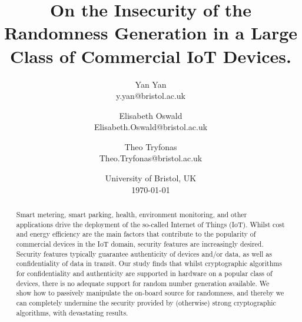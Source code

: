 \documentclass{article}
\title{On the Insecurity of the Randomness Generation in a Large Class of Commercial IoT Devices.}
\author{ 
Yan Yan \\ 
y.yan@bristol.ac.uk
\and
Elisabeth Oswald \\ 
Elisabeth.Oswald@bristol.ac.uk
\and
Theo Tryfonas \\ 
Theo.Tryfonas@bristol.ac.uk
}
\date{University of Bristol, UK \\ \today}
\begin{document}
\maketitle

\begin{abstract}
Smart metering, smart parking, health, environment monitoring, and other applications drive the deployment of the so-called Internet of Things (IoT). Whilst cost and energy efficiency are the main factors that contribute to the popularity of commercial devices in the IoT domain, security features are increasingly desired. Security features typically guarantee authenticity of devices and/or data, as well as confidentiality of data in transit. Our study finds that whilst cryptographic algorithms for confidentiality and authenticity are supported in hardware on a popular class of devices, there is no adequate support for random number generation available. We show how to passively manipulate the on-board source for randomness, and thereby we can completely undermine the security provided by (otherwise) strong cryptographic algorithms, with devastating results. 
\end{abstract}








\appendix

\end{document}
